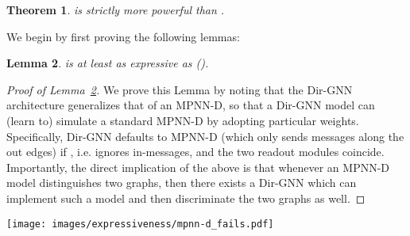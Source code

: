 \documentclass{article}
\newcommand\oursacro{Dir-GNN}
\theoremstyle{plain}
\newtheorem{theorem}{Theorem}[section]
\newtheorem{lemma}[theorem]{Lemma}
\theoremstyle{definition}
\theoremstyle{remark}
\begin{document}
\begin{theorem}\label{thm:dirgnn-strictly-more-expressive-than-mpnn-d}
     is strictly more powerful than .
\end{theorem}

We begin by first proving the following lemmas:

\begin{lemma}\label{lemma:dirgnn-at-least-as-expressive-as-mpnn-d}
     is at least as expressive as  (). 
\end{lemma}

\begin{proof}[Proof of Lemma~\ref{lemma:dirgnn-at-least-as-expressive-as-mpnn-d}]
    We prove this Lemma by noting that the \oursacro{} architecture generalizes that of an MPNN-D, so that a \oursacro{} model can (learn to) simulate a standard MPNN-D by adopting particular weights. Specifically, \oursacro{} defaults to MPNN-D (which only sends messages along the out edges) if , i.e.  ignores in-messages, and the two readout modules coincide. Importantly, the direct implication of the above is that whenever an MPNN-D model distinguishes two graphs, then there exists a \oursacro{} which can implement such a model and then discriminate the two graphs as well.
\end{proof}

\begin{figure*}
    \centering
    \texttt{[image: images/expressiveness/mpnn-d\_fails.pdf]}
    \vspace{3mm}
    \caption{Two non-isomorphic directed graphs that cannot be distinguished by any MPNN-D model but can be distinguished by \oursacro{}.}
    \label{fig:mpnn-d_fails}
\end{figure*}
\end{document}
